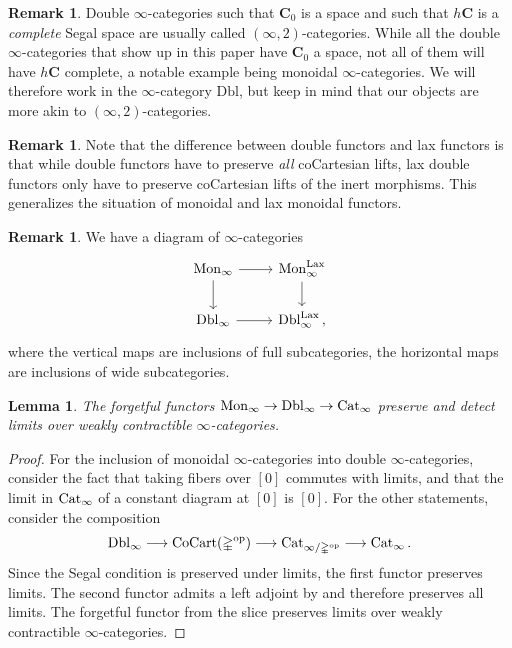 \documentclass[10pt]{amsart}
\numberwithin{equation}{section}
\newtheorem{lem}[prop]{Lemma}
\theoremstyle{definition}
\newtheorem{rem}[prop]{Remark}
\DeclareMathOperator{\op}{op}
\DeclareMathOperator{\Lax}{Lax}
\DeclareMathOperator{\CoCart}{CoCart}
\newcommand{\Cat}{\mathrm{Cat}\vphantom{t}}
\newcommand{\Simp}{\mathbb{\Delta}}
\newcommand{\bfC}{\mathbf{C}}
\newcommand{\Dbl}{\mathrm{Dbl}}
\newcommand{\DblLax}{ \mathrm{Dbl}_{\infty}^{\Lax}  }
\newcommand{\Mon}{\mathrm{Mon}_{\infty}}
\newcommand{\MonLax}{\mathrm{Mon}_{\infty}^{\Lax}}
\renewcommand{\to}{\mathchoice{\longrightarrow}{\rightarrow}{}{}}
\begin{document}
	\begin{rem}\label{rem:double_cat_with_space_of_objects}
		Double $\infty$-categories such that $\bfC_{0}$ is a space and such that $h\bfC$ is a \emph{complete} Segal space are usually called $(\infty,2)$-categories.
    While all the double $\infty$-categories that show up in this paper have $\bfC_{0}$ a space, not all of them will have $h\bfC$ complete, a notable example being monoidal $\infty$-categories.
    We will therefore work in the $\infty$-category $\Dbl$, but keep in mind that our objects are more akin to $(\infty,2)$-categories.
	\end{rem}

	\begin{rem}\label{rem:lax_vs_double_functors}
		Note that the difference between double functors and lax functors is that while double functors have to preserve \emph{all} coCartesian lifts, lax double functors only have to preserve coCartesian lifts of the inert morphisms.
		This generalizes the situation of monoidal and lax monoidal functors.
	\end{rem}


	\begin{rem}\label{rem:Mon->Dbl}
		We have a diagram of $\infty$-categories
		\begin{equation*}
			\begin{tikzcd}
				\Mon \arrow[r] \arrow[d] & \MonLax \arrow[d] \\
				\Dbl_{\infty} \arrow[r] & \DblLax \, ,
			\end{tikzcd}
		\end{equation*}
		where the vertical maps are inclusions of full subcategories, the horizontal maps are inclusions of wide subcategories.
	\end{rem}

	\begin{lem}\label{lem:Mon->Dbl->Cat}
		The forgetful functors $\Mon \to \Dbl_{\infty} \to \Cat_{\infty}$ preserve and detect limits over weakly contractible $\infty$-categories.
	\end{lem}

	\begin{proof}
		For the inclusion of monoidal $\infty$-categories into double $\infty$-categories, consider the fact that taking fibers over $[0]$ commutes with limits, and that the limit in $\Cat_{\infty}$ of a constant diagram at $[0]$ is $[0]$.
		For the other statements, consider the composition
		\begin{align*}
			\Dbl_{\infty} \to \CoCart(\Simp^{\op}) \to \Cat_{\infty /\Simp^{\op}} \to \Cat_{\infty} \,.
		\end{align*}
		Since the Segal condition is preserved under limits, the first functor preserves limits.
    The second functor admits a left adjoint by \cite*[\S 1.1]{mazel2015all} and therefore preserves all limits. The forgetful functor from the slice preserves limits over weakly contractible $\infty$-categories.
	\end{proof}
\end{document}
